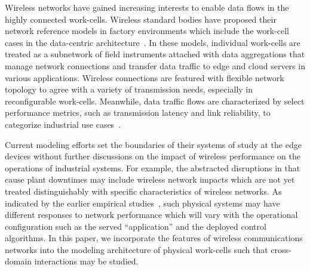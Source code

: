 \documentclass[journal, twoside]{IEEEtran}
\begin{document}
Wireless networks have gained increasing interests to enable data flows in the highly connected work-cells.
Wireless standard bodies have proposed their network reference models in factory environments which include the work-cell cases in the data-centric architecture~\cite{ETSI889, KPItable}. In these models, individual work-cells are treated as a subnetwork of field instruments attached with data aggregations that manage network connections and transfer data traffic to edge and cloud servers in various applications.
Wireless connections are featured with flexible network topology to agree with a variety of transmission needs, especially in reconfigurable work-cells. Meanwhile, data traffic flows are characterized by select performance metrics, such as transmission latency and link reliability, to categorize industrial use cases~\cite{KPItable}. 

Current modeling efforts set the boundaries of their systems of study at the edge devices without further discussions on the impact of wireless performance on the operations of industrial systems. For example, the abstracted disruptions in \cite{QChang,Liu2012} that cause plant downtimes may include wireless network impacts which are not yet treated distinguishably with specific characteristics of wireless networks. As indicated by the earlier empirical studies~\cite{LIU2017412}, such physical systems may have different responses to network performance which will vary with the operational configuration such as the served ``application'' and the deployed control algorithms. In this paper, we incorporate the features of wireless communications networks into the modeling architecture of physical work-cells such that cross-domain interactions may be studied.
    
\end{document}
